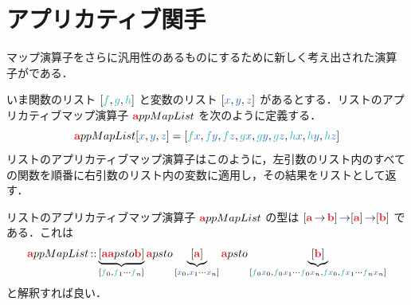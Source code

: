 \documentclass[a5paper,twoside,fleqn,draft]{jsbook}
\begin{document}


\section{アプリカティブ関手}

マップ演算子をさらに汎用性のあるものにするために新しく考え出された演算子がである．

いま関数のリスト $[\hFunc{f},\hFunc{g},\mHFunc]$ と変数のリスト $[\hVar{x},\hVar{y},\hVar{z}]$ があるとする．リストのアプリカティブマップ演算子 $\hTypeName{a}ppMapList$ を次のように定義する．
\begin{equation}
  [\hFunc{f},\hFunc{g},\mHFunc]\hTypeName{a}ppMapList[\hVar{x},\hVar{y},\hVar{z}]
  =[\hFunc{f}\hVar{x},\hFunc{f}\hVar{y},\hFunc{f}\hVar{z},\hFunc{g}\hVar{x},\hFunc{g}\hVar{y},\hFunc{g}\hVar{z},\mHFunc\hVar{x},\mHFunc\hVar{y},\mHFunc\hVar{z}]
\end{equation}
リストのアプリカティブマップ演算子はこのように，左引数のリスト内のすべての関数を順番に右引数のリスト内の変数に適用し，その結果をリストとして返す．

リストのアプリカティブマップ演算子 $\hTypeName{a}ppMapList$ の型は
$[\hTypeName{a}\hFunctionArrow\hTypeName{b}]\hFunctionArrow\hListConstruct{\hTypeName{a}}\hFunctionArrow[\hTypeName{b}]$ である．これは
\begin{equation}
  \hTypeName{a}ppMapList
  \hIsTypeOf\underbrace{[\hTypeName{a}\hTypeName{a}psto\hTypeName{b}]}_{[\hFunc{f}_0,\hFunc{f}_1\dotsb \hFunc{f}_n]}
  \hTypeName{a}psto\underbrace{\hListConstruct{\hTypeName{a}}}_{[\hVar{x}_0,\hVar{x}_1\dotsb \hVar{x}_n]}
  \hTypeName{a}psto\underbrace{[\hTypeName{b}]}_{[\hFunc{f}_0\hVar{x}_0,\hFunc{f}_0\hVar{x}_1\dotsb \hFunc{f}_0\hVar{x}_n,\hFunc{f} \hVar{x}_0,\hFunc{f} \hVar{x}_1\dotsb \hFunc{f}_n\hVar{x}_n]}
\end{equation}
と解釈すれば良い．
\end{document}
